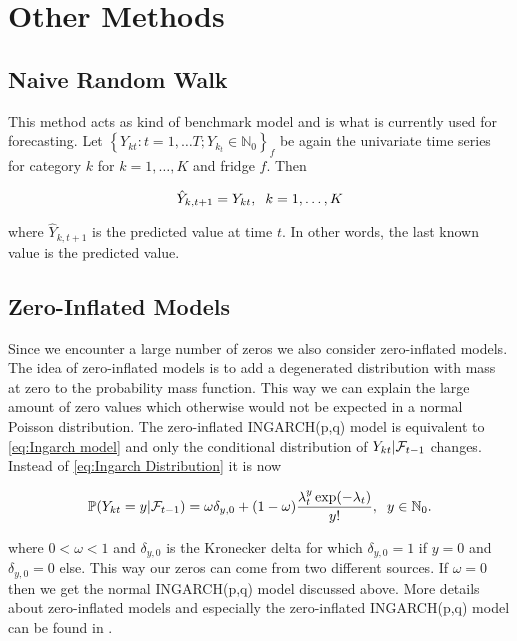 \section{Other Methods}
\label{sec: Other methods}

\subsection{Naive Random Walk}
\label{sec: Naive Random Walk}

This method acts as kind of benchmark model and is what is currently used for forecasting. Let $\left\{Y_{kt}:t=1,\ldots T; Y_{k_t} \in \mathbb{N}_0\right\}_f$ be again the univariate time series for category $k$ for $k=1,\ldots,K$ and fridge $f$. Then

\begin{equation}
\hat{Y}_{k,t+1}= Y_{kt} ,\hspace{0.2cm} k=1,\ldots,K
\label{eq: Random Walk Model}
\end{equation}

where $\hat{Y}_{k,t+1}$ is the predicted value at time $t$. In other words, the last known value is the predicted value. 


\subsection{Zero-Inflated Models}
\label{sec: Zim}

Since we encounter a large number of zeros we also consider zero-inflated models. The idea of zero-inflated models is to add a degenerated distribution with mass at zero to the probability mass function. This way we can explain the large amount of zero values which otherwise would not be expected in a normal Poisson distribution. The zero-inflated INGARCH(p,q) model is equivalent to \ref{eq:Ingarch model} and only the conditional distribution of $Y_{kt}| \mathcal{F}_{t-1}$ changes. Instead of \ref{eq:Ingarch Distribution} it is now 

\begin{equation}
\mathbb{P}(Y_{kt}=y | \mathcal{F}_{t-1}) = \omega \delta_{y,0}+ (1-\omega) \frac{\lambda_t^y \exp(-\lambda_t)}{y!}, \hspace{0.2cm} y \in \mathbb{N}_0.
\label{eq:ZIP Distribution}
\end{equation}

where $0 < \omega < 1$ and $\delta_{y,0}$ is the Kronecker delta for which $\delta_{y,0}=1$ if $y=0$ and $\delta_{y,0}=0$ else. This way our zeros can come from two different sources. If $\omega =0$ then we get the normal INGARCH(p,q) model discussed above. More details about zero-inflated models and especially the zero-inflated INGARCH(p,q) model can be found in \cite{Zhu:2012}.


